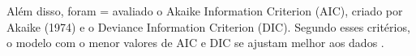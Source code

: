 \begin{comment}
---------------------------

Para verificar a adequação do melhor modelo, TLI e CFI são dois índices de ajuste usados na teoria de resposta ao item para avaliar o ajuste do modelo aos dados \cite{alvarenga2020item}.

 TLI significa Índice Tucker-Lewis e CFI significa Índice de Ajuste Comparativo. Esses índices de ajuste fornecem informações sobre o quão bem o modelo se ajusta às respostas dos itens observados. O TLI compara o ajuste do modelo especificado com um modelo nulo, enquanto o CFI compara o ajuste do modelo especificado com um modelo de linha de base. Valores mais altos de TLI e CFI indicam melhor ajuste entre o modelo e os dados. Esses índices de ajuste são aplicados no IRT para avaliar a adequação do modelo em representar a relação entre a característica latente e as respostas dos itens observados. 


RMSEA: O índice de raiz quadrada média do erro de aproximação (RMSEA) é um índice de ajuste absoluto que mede a discrepância média entre o modelo especificado e os dados observados. O valor do RMSEA varia de 0 a 1, e valores abaixo de 0,05 indicam um bom ajuste do modelo. Valores entre 0,05 e 0,08 indicam um ajuste razoável, enquanto valores acima de 0,10 indicam um ajuste pobre. O RMSEA é calculado como a diferença entre a discrepância média observada e a discrepância média esperada, dividida pelo número de graus de liberdade do modelo.

SRMR: O Índice Raiz Quadrada Média Residual Padronizada (SRMR) é uma medida de ajuste global que avalia a diferença entre as correlações observadas e as correlações estimadas pelo modelo. Em outras palavras, ele mede a discrepância entre as correlações amostrais e as correlações que o modelo estima. É uma medida padronizada, o que significa que ele é independente da escala de medida das variáveis do modelo. Ele é calculado dividindo o erro médio quadrático (EMQ) pelo erro médio quadrático residual (EMQr), que é a diferença entre o EMQ e o EMQ dos resíduos. O valor do SRMR varia de 0 a 1, sendo que valores menores indicam um melhor ajuste do modelo. Uma regra geral é que um valor de SRMR menor que 0,08 indica um bom ajuste do modelo, enquanto valores acima de 0,1 indicam um ajuste pobre. Valores entre 0,08 e 0,1 indicam um ajuste razoável.

(buscar referencias)
\end{comment}
Além disso, foram = avaliado o Akaike Information Criterion (AIC), criado por Akaike (1974) e o Deviance Information Criterion (DIC). Segundo esses critérios, o modelo com o menor valores de AIC e DIC se ajustam melhor aos dados \cite{raftery2006}.




